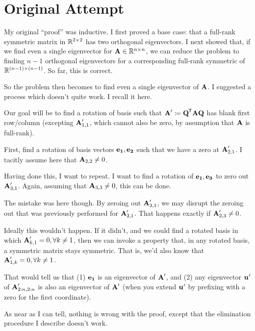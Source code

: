 \section{Original Attempt}

My original ``proof'' was inductive. I first proved a base case: that a
full-rank symmetric matrix in $\mathbb{R}^{2 \times 2}$ has two orthogonal
eigenvectors. I next showed that, if we find even a single eigenvector
for $\bm{\mathrm{A}} \in \mathbb{R}^{n \times n}$, we can reduce the problem to finding $n-1$
orthogonal eigenvectors for a corresponding full-rank symmetric of
$\mathbb{R}^{(n-1) \times (n-1)}$. So far, this is correct.

So the problem then becomes to find even a single eigenvector of
$\bm{\mathrm{A}}$. I suggested a process which doesn't quite work. I recall it
here.

Our goal will be to find a rotation of basis such that $\bm{\mathrm{A}}' \coloneqq
\bm{\mathrm{Q}}^{\mkern-1.5mu\mathsf{T}}\bm{\mathrm{A}}\bm{\mathrm{Q}}$ has blank first row/column (excepting $\bm{\mathrm{A}}'_{1, 1}$, which
cannot also be zero, by assumption that $\bm{\mathrm{A}}$ is full-rank).

First, find a rotation of basis vectors $\bm{\mathrm{e}}_{\bm{\mathrm{1}}}, \bm{\mathrm{e}}_{\bm{\mathrm{2}}}$ such that
we have a zero at $\bm{\mathrm{A}}'_{2, 1}$. I tacitly assume here that $\bm{\mathrm{A}}_{2,
2} \ne 0$.

Having done this, I want to repeat. I want to find a rotation of
$\bm{\mathrm{e}}_{\bm{\mathrm{1}}}, \bm{\mathrm{e}}_{\bm{\mathrm{3}}}$ to zero out $\bm{\mathrm{A}}'_{3, 1}$. Again, assuming that
$\bm{\mathrm{A}}_{3, 3} \ne 0$, this can be done.

The mistake was here though. By zeroing out $\bm{\mathrm{A}}'_{3, 1}$, we may
disrupt the zeroing out that was previously performed for $\bm{\mathrm{A}}'_{2,
1}$. That happens exactly if $\bm{\mathrm{A}}'_{2, 3} \ne 0$.

Ideally this wouldn't happen. If it didn't, and we could find a rotated
basis in which $\bm{\mathrm{A}}'_{k, 1} = 0, \forall k\ne 1$, then we can invoke a
property that, in any rotated basis, a symmetric matrix stays symmetric.
That is, we'd also know that $\bm{\mathrm{A}}'_{1, k} = 0, \forall k\ne 1$.

That would tell us that (1) $\bm{\mathrm{e}}_{\bm{\mathrm{1}}}$ is an eigenvector of $\bm{\mathrm{A}}'$,
and (2) any eigenvector $\bm{\mathrm{u_{\bm{\mathrm{}}}}}'$ of $\bm{\mathrm{A}}'_{2:n, 2:n}$ is also an
eigenvector of $\bm{\mathrm{A}}'$ (when you extend $\bm{\mathrm{u_{\bm{\mathrm{}}}}}'$ by prefixing with a
zero for the first coordinate).

As near as I can tell, nothing is wrong with the proof, except that the
elimination procedure I describe doesn't work.
